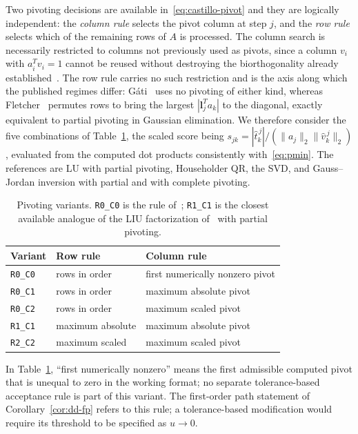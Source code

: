 \documentclass[review,onefignum,onetabnum]{siamart251216}
\begin{document}
Two pivoting decisions are available in~\eqref{eq:castillo-pivot} and they are logically
independent: the \emph{column rule} selects the pivot column at step $j$, and the \emph{row
rule} selects which of the remaining rows of $A$ is processed. The column search is necessarily
restricted to columns not previously used as pivots, since a column $v_i$ with $a_i^Tv_i=1$
cannot be reused without destroying the biorthogonality already
established~\cite[Algorithm~1, Step~3]{CastilloPSM2006}. The row rule carries no such
restriction and is the axis along which the published regimes differ: G\'ati~\cite{Gati2013}
uses no pivoting of either kind, whereas Fletcher~\cite[\S2]{Fletcher1997} permutes rows to
bring the largest $|\mathbf{l}_j^Ta_k|$ to the diagonal, exactly equivalent to partial pivoting
in Gaussian elimination. We therefore consider the five combinations of
Table~\ref{tab:variants}, the scaled score being
$s_{jk} = |\hat t^{\,j}_k|/(\|a_j\|_2\|\widehat v_k^{\,j}\|_2)$, evaluated from the computed dot
products consistently with~\eqref{eq:pmin}. The references are LU with partial pivoting,
Householder QR, the SVD, and Gauss--Jordan inversion with partial and with complete pivoting.

\begin{table}
\centering
\caption{Pivoting variants. \texttt{R0\_C0} is the rule of~\cite{CastilloCJPC2000};
\texttt{R1\_C1} is the closest available analogue of the LIU factorization
of~\cite{Fletcher1997} with partial pivoting.}
\label{tab:variants}
\begin{tabular}{lll}
\hline
Variant & Row rule & Column rule \\
\hline
\texttt{R0\_C0} & rows in order & first numerically nonzero pivot \\
\texttt{R0\_C1} & rows in order & maximum absolute pivot \\
\texttt{R0\_C2} & rows in order & maximum scaled pivot \\
\texttt{R1\_C1} & maximum absolute & maximum absolute pivot \\
\texttt{R2\_C2} & maximum scaled  & maximum scaled pivot \\
\hline
\end{tabular}
\end{table}

In Table~\ref{tab:variants}, ``first numerically nonzero'' means the first admissible computed
pivot that is unequal to zero in the working format; no separate tolerance-based acceptance rule is
part of this variant. The first-order path statement of Corollary~\ref{cor:dd-fp} refers to this
rule; a tolerance-based modification would require its threshold to be specified as $u\to0$.
\end{document}

